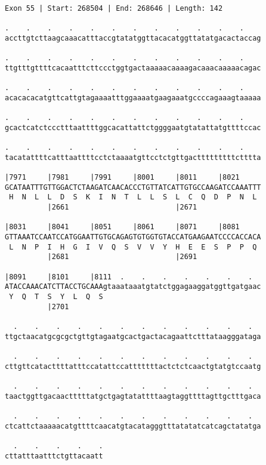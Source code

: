 \documentclass{article}
\begin{document}
\begin{Verbatim}
Exon 55 | Start: 268504 | End: 268646 | Length: 142
 
.    .    .    .    .    .    .    .    .    .    .    .    
accttgtcttaagcaaacatttaccgtatatggttacacatggttatatgacactaccag
  
.    .    .    .    .    .    .    .    .    .    .    .    
ttgtttgttttcacaatttcttccctggtgactaaaaacaaaagacaaacaaaaacagac
  
.    .    .    .    .    .    .    .    .    .    .    .    
acacacacatgttcattgtagaaaatttggaaaatgaagaaatgccccagaaagtaaaaa
  
.    .    .    .    .    .    .    .    .    .    .    .    
gcactcatctccctttaattttggcacattattctggggaatgtatattatgttttccac
  
.    .    .    .    .    .    .    .    .    .    .    .    
tacatattttcatttaattttcctctaaaatgttcctctgttgactttttttttctttta
  
|7971     |7981     |7991     |8001     |8011     |8021     
GCATAATTTGTTGGACTCTAAGATCAACACCCTGTTATCATTGTGCCAAGATCCAAATTT
 H  N  L  L  D  S  K  I  N  T  L  L  S  L  C  Q  D  P  N  L 
          |2661                         |2671               
  
|8031     |8041     |8051     |8061     |8071     |8081     
GTTAAATCCAATCCATGGAATTGTGCAGAGTGTGGTGTACCATGAAGAATCCCCACCACA
 L  N  P  I  H  G  I  V  Q  S  V  V  Y  H  E  E  S  P  P  Q 
          |2681                         |2691               
  
|8091     |8101     |8111  .    .    .    .    .    .    .  
ATACCAAACATCTTACCTGCAAAgtaaataaatgtatctggagaaggatggttgatgaac
 Y  Q  T  S  Y  L  Q  S                                     
          |2701                                             
  
  .    .    .    .    .    .    .    .    .    .    .    .  
ttgctaacatgcgcgctgttgtagaatgcactgactacagaattctttataagggataga
  
  .    .    .    .    .    .    .    .    .    .    .    .  
cttgttcatacttttatttccatattccatttttttactctctcaactgtatgtccaatg
  
  .    .    .    .    .    .    .    .    .    .    .    .  
taactggttgacaactttttatgctgagtatattttaagtaggttttagttgctttgaca
  
  .    .    .    .    .    .    .    .    .    .    .    .  
ctcattctaaaaacatgttttcaacatgtacatagggtttatatatcatcagctatatga
  
  .    .    .    .    .
cttatttaatttctgttacaatt
\end{Verbatim}
\end{document}

